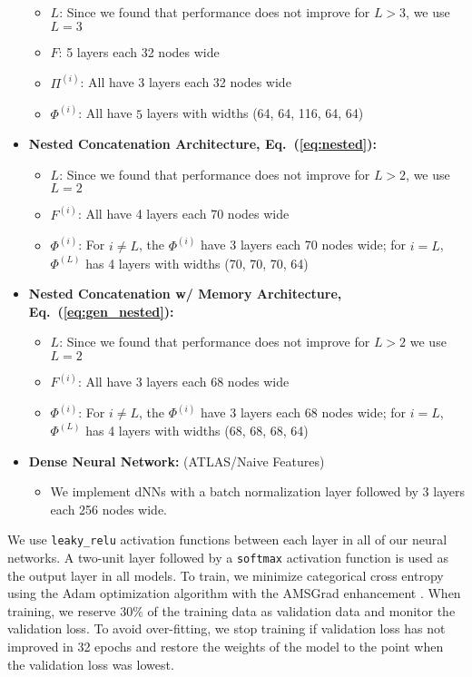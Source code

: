 \documentclass[aps,prd,twocolumn,superscriptaddress,floatfix,longbibliography,preprintnumbers,nofootinbib]{revtex4-1} %
\DeclareRobustCommand{\Eq}[1]{Eq.~(\ref{eq:#1})}
\begin{document}
\begin{itemize}
      \begin{itemize}
        \item \(L\): Since we found that performance does not improve for \(L>3\), we use \(L=3\)
        \item \(F\): 5 layers each 32 nodes wide
        \item \(\Pi^{(i)}\): All have 3 layers each 32 nodes wide
        \item \(\Phi^{(i)}\): All have \(5\) layers with widths (64, 64, 116, 64, 64)
      \end{itemize}
    \item \textbf{Nested Concatenation Architecture, \Eq{nested}:} 
      \begin{itemize}
        \item \(L\): Since we found that performance does not improve for \(L>2\), we use \(L=2\)
        \item \(F^{(i)}\): All have 4 layers each 70 nodes wide
        \item \(\Phi^{(i)}\): For \(i\ne L\), the \(\Phi^{(i)}\) have 3 layers each 70 nodes wide; for \(i=L\), \(\Phi^{(L)}\) has 4 layers with widths (70, 70, 70, 64)
      \end{itemize}    
    \item \textbf{Nested Concatenation w/ Memory Architecture, \Eq{gen_nested}:} 
      \begin{itemize}
        \item \(L\): Since we found that performance does not improve for \(L>2\) we use \(L=2\)
        \item \(F^{(i)}\): All have 3 layers each 68 nodes wide
        \item \(\Phi^{(i)}\): For \(i\ne L\), the \(\Phi^{(i)}\) have 3 layers each 68 nodes wide; for \(i=L\), \(\Phi^{(L)}\) has 4 layers with widths (68, 68, 68, 64)
      \end{itemize}
    \item \textbf{Dense Neural Network:} (ATLAS/Naive Features)
      \begin{itemize}
        \item We implement dNNs with a batch normalization layer \cite{Ioffe:2015ovl} followed by 3 layers each 256 nodes wide. 
      \end{itemize}
\end{itemize}


We use \texttt{leaky\_relu} activation functions between each layer in all of our neural networks.
%
A two-unit layer followed by a \texttt{softmax} activation function is used as the output layer in all models.
%
To train, we minimize categorical cross entropy using the {\sc Adam} optimization algorithm \cite{Kingma:2014vow} with the {\sc AMSGrad} enhancement \cite{Reddi2019}.
%
When training, we reserve \(30\%\) of the training data as validation data and monitor the validation loss.
%
To avoid over-fitting, we stop training if validation loss has not improved in 32 epochs and restore the weights of the model to the point when the validation loss was lowest.
\end{document}
